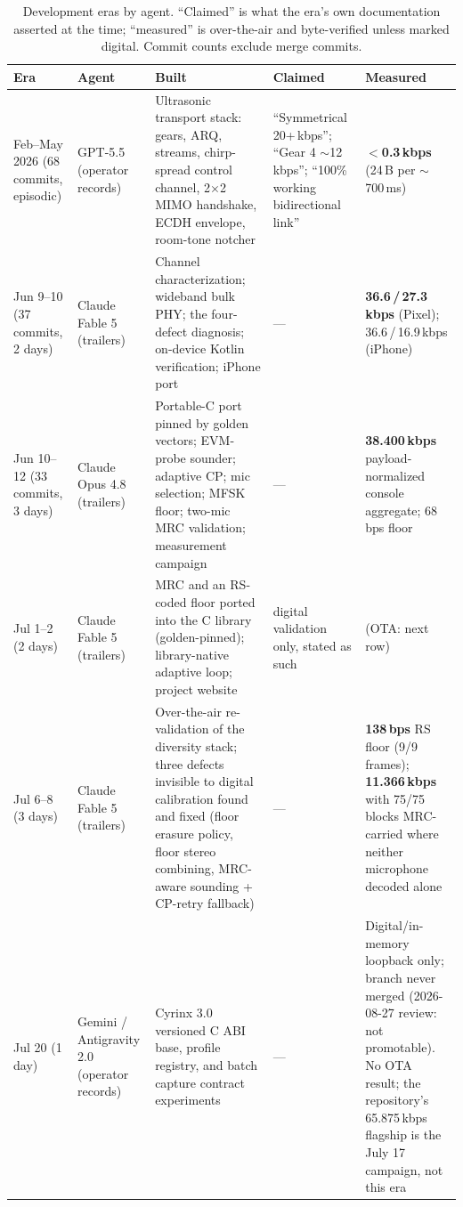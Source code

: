 \documentclass[11pt]{article}
\begin{document}
\begin{table}[t]
\centering
\caption{Development eras by agent. ``Claimed'' is what the era's own
documentation asserted at the time; ``measured'' is over-the-air and
byte-verified unless marked digital. Commit counts exclude merge commits.}
\label{tab:eras}
\small
\begin{tabular}{@{}p{2.0cm}p{2.2cm}p{4.6cm}p{2.5cm}p{2.6cm}@{}}
\toprule
Era & Agent & Built & Claimed & Measured \\
\midrule
Feb--May 2026 (68 commits, episodic) & GPT-5.5 (operator records) &
Ultrasonic transport stack: gears, ARQ, streams, chirp-spread control
channel, 2$\times$2 MIMO handshake, ECDH envelope, room-tone notcher &
``Symmetrical 20+\,kbps''; ``Gear 4 $\sim$12\,kbps''; ``100\% working
bidirectional link'' & \textbf{$<$0.3\,kbps} (24\,B per $\sim$700\,ms) \\
\addlinespace
Jun 9--10 (37 commits, 2 days) & Claude Fable 5 (trailers) &
Channel characterization; wideband bulk PHY; the four-defect diagnosis;
on-device Kotlin verification; iPhone port & --- &
\textbf{36.6\,/\,27.3\,kbps} (Pixel); 36.6\,/\,16.9\,kbps (iPhone) \\
\addlinespace
Jun 10--12 (33 commits, 3 days) & Claude Opus 4.8 (trailers) &
Portable-C port pinned by golden vectors; EVM-probe sounder; adaptive CP;
mic selection; MFSK floor; two-mic MRC validation; measurement campaign &
--- & \textbf{38.400\,kbps} payload-normalized console aggregate; 68\,bps floor \\
\addlinespace
Jul 1--2 (2 days) & Claude Fable 5 (trailers) &
MRC and an RS-coded floor ported into the C library (golden-pinned);
library-native adaptive loop; project website & digital validation only,
stated as such & (OTA: next row) \\
\addlinespace
Jul 6--8 (3 days) & Claude Fable 5 (trailers) &
Over-the-air re-validation of the diversity stack; three defects invisible
to digital calibration found and fixed (floor erasure policy, floor stereo
combining, MRC-aware sounding + CP-retry fallback) & --- &
\textbf{138\,bps} RS floor (9/9 frames); \textbf{11.366\,kbps} with 75/75
blocks MRC-carried where neither microphone decoded alone \\
\addlinespace
Jul 20 (1 day) & Gemini / Antigravity 2.0 (operator records) &
Cyrinx 3.0 versioned C ABI base, profile registry, and batch capture
contract experiments & --- &
Digital/in-memory loopback only; branch never merged (2026-08-27 review:
not promotable). No OTA result; the repository's 65.875\,kbps flagship is
the July 17 campaign, not this era \\
\bottomrule
\end{tabular}
\end{table}
\end{document}
